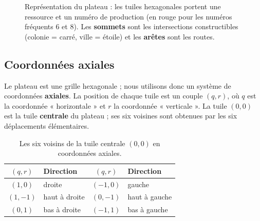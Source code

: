 \documentclass[11pt,a4paper]{article}
\begin{document}
\begin{figure}[h]
\caption{Représentation du plateau : les tuiles hexagonales portent une ressource et
un numéro de production (en rouge pour les numéros fréquents $6$ et $8$). Les
\textbf{sommets} sont les intersections constructibles (colonie = carré, ville =
étoile) et les \textbf{arêtes} sont les routes.}
\end{figure}

\subsection{Coordonnées axiales}

Le plateau est une grille hexagonale ; nous utilisons donc un système de coordonnées
\textbf{axiales}. La position de chaque tuile est un couple $(q, r)$, où $q$ est la
coordonnée « horizontale » et $r$ la coordonnée « verticale ». La tuile $(0,0)$ est la
tuile \textbf{centrale} du plateau ; ses six voisines sont obtenues par les six
déplacements élémentaires.

\begin{table}[h]
\centering
\renewcommand{\arraystretch}{1.25}
\begin{tabular}{c l c l}
\toprule
$(q,r)$ & Direction & $(q,r)$ & Direction \\
\midrule
$(1,0)$  & droite              & $(-1,0)$ & gauche \\
$(1,-1)$ & haut à droite       & $(0,-1)$ & haut à gauche \\
$(0,1)$  & bas à droite        & $(-1,1)$ & bas à gauche \\
\bottomrule
\end{tabular}
\caption{Les six voisins de la tuile centrale $(0,0)$ en coordonnées axiales.}
\end{table}
\end{document}

